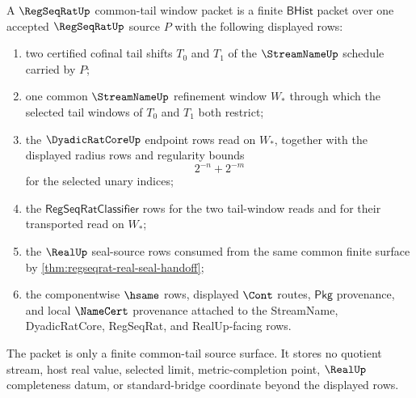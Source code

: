 \begin{definition}
\label{def:regseqrat-common-tail-window-packet}
A $\RegSeqRatUp$ common-tail window packet is a finite $\mathsf{BHist}$ packet over one accepted $\RegSeqRatUp$ source $P$ with the following displayed rows:
\begin{enumerate}
\item two certified cofinal tail shifts $T_0$ and $T_1$ of the $\StreamNameUp$ schedule carried by $P$;
\item one common $\StreamNameUp$ refinement window $W_\ast$ through which the selected tail windows of $T_0$ and $T_1$ both restrict;
\item the $\DyadicRatCoreUp$ endpoint rows read on $W_\ast$, together with the displayed radius rows and regularity bounds
$$
2^{-n}+2^{-m}
$$
for the selected unary indices;
\item the $\mathsf{RegSeqRatClassifier}$ rows for the two tail-window reads and for their transported read on $W_\ast$;
\item the $\RealUp$ seal-source rows consumed from the same common finite surface by \autoref{thm:regseqrat-real-seal-handoff};
\item the componentwise $\hsame$ rows, displayed $\Cont$ routes, $\mathsf{Pkg}$ provenance, and local $\NameCert$ provenance attached to the StreamName, DyadicRatCore, RegSeqRat, and RealUp-facing rows.
\end{enumerate}
The packet is only a finite common-tail source surface. It stores no quotient stream, host real value, selected limit, metric-completion point, $\RealUp$ completeness datum, or standard-bridge coordinate beyond the displayed rows.
\end{definition}

